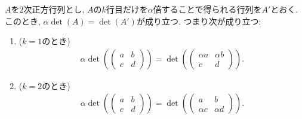 \begin{theorem}
  \label{thm:multlin:row:prod}
  $A$を$2$次正方行列とし,
  $A$の$k$行目だけを$\alpha$倍することで得られる行列を$A'$とおく.
  このとき, $\alpha\det(A)=\det(A')$が成り立つ.
  つまり次が成り立つ:
  \begin{enumerate}
    \item ($k=1$のとき)
      \begin{align*}
        \alpha\det(\begin{pmatrix}a&b\\c&d\end{pmatrix})
          =
       \det(\begin{pmatrix}\alpha  a&\alpha b\\c&d\end{pmatrix}).
      \end{align*}
    \item ($k=2$のとき)
      \begin{align*}
        \alpha\det(\begin{pmatrix}a&b\\c&d\end{pmatrix})
          =
       \det(\begin{pmatrix}a&b\\\alpha   c&\alpha  d\end{pmatrix}).
      \end{align*}
  \end{enumerate}
\end{theorem}

